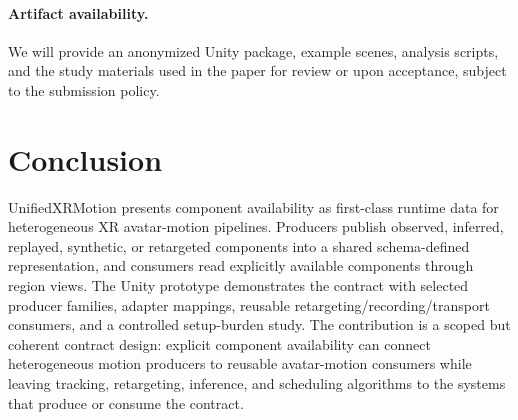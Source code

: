 \documentclass[runningheads]{llncs}
\begin{document}
\paragraph{Artifact availability.}
We will provide an anonymized Unity package, example scenes, analysis scripts, and the study materials used in the paper for review or upon acceptance, subject to the submission policy.

\section{Conclusion}\label{sec:conclusion}
UnifiedXRMotion presents component availability as first-class runtime data for heterogeneous XR avatar-motion pipelines. Producers publish observed, inferred, replayed, synthetic, or retargeted components into a shared schema-defined representation, and consumers read explicitly available components through region views. The Unity prototype demonstrates the contract with selected producer families, adapter mappings, reusable retargeting/recording/transport consumers, and a controlled setup-burden study. The contribution is a scoped but coherent contract design: explicit component availability can connect heterogeneous motion producers to reusable avatar-motion consumers while leaving tracking, retargeting, inference, and scheduling algorithms to the systems that produce or consume the contract.



\end{document}
